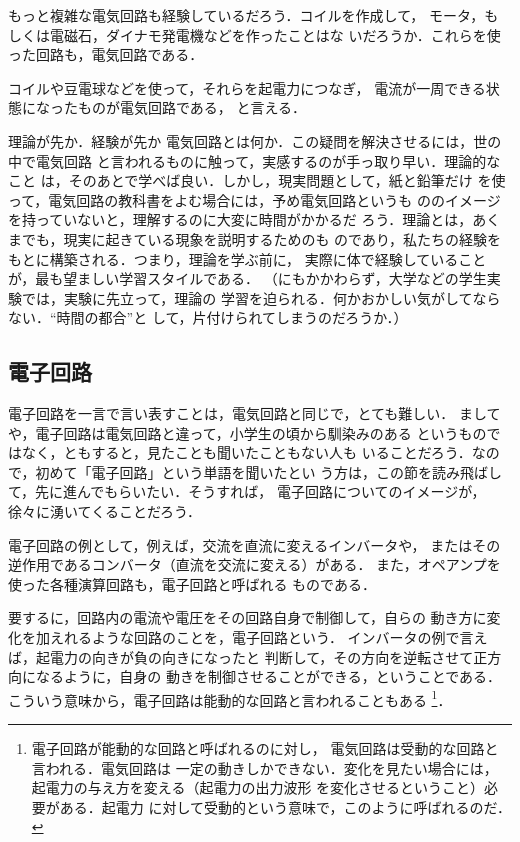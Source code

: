         もっと複雑な電気回路も経験しているだろう．コイルを作成して，
        モータ，もしくは電磁石，ダイナモ発電機などを作ったことはな
        いだろうか．これらを使った回路も，電気回路である．

        コイルや豆電球などを使って，それらを起電力につなぎ，
        電流が一周できる状態になったものが電気回路である，
        と言える．

        \begin{memo}{理論が先か．経験が先か}
            電気回路とは何か．この疑問を解決させるには，世の中で電気回路
            と言われるものに触って，実感するのが手っ取り早い．理論的なこと
            は，そのあとで学べば良い．しかし，現実問題として，紙と鉛筆だけ
            を使って，電気回路の教科書をよむ場合には，予め電気回路というも
            ののイメージを持っていないと，理解するのに大変に時間がかかるだ
            ろう．理論とは，あくまでも，現実に起きている現象を説明するためのも
            のであり，私たちの経験をもとに構築される．つまり，理論を学ぶ前に，
            実際に体で経験していることが，最も望ましい学習スタイルである．
            （にもかかわらず，大学などの学生実験では，実験に先立って，理論の
            学習を迫られる．何かおかしい気がしてならない．“時間の都合”と
            して，片付けられてしまうのだろうか．）
        \end{memo}

    \subsection{電子回路}
        電子回路を一言で言い表すことは，電気回路と同じで，とても難しい．
        ましてや，電子回路は電気回路と違って，小学生の頃から馴染みのある
        というものではなく，ともすると，見たことも聞いたこともない人も
        いることだろう．なので，初めて「電子回路」という単語を聞いたとい
        う方は，この節を読み飛ばして，先に進んでもらいたい．そうすれば，
        電子回路についてのイメージが，徐々に湧いてくることだろう．

        電子回路の例として，例えば，交流を直流に変えるインバータや，
        またはその逆作用であるコンバータ（直流を交流に変える）がある．
        また，オペアンプを使った各種演算回路も，電子回路と呼ばれる
        ものである．

        要するに，回路内の電流や電圧をその回路自身で制御して，自らの
        動き方に変化を加えれるような回路のことを，電子回路という．
        インバータの例で言えば，起電力の向きが負の向きになったと
        判断して，その方向を逆転させて正方向になるように，自身の
        動きを制御させることができる，ということである．
        こういう意味から，電子回路は能動的な回路と言われることもある
            \footnote{
                電子回路が能動的な回路と呼ばれるのに対し，
                電気回路は受動的な回路と言われる．電気回路は
                一定の動きしかできない．変化を見たい場合には，
                起電力の与え方を変える（起電力の出力波形
                を変化させるということ）必要がある．起電力
                に対して受動的という意味で，このように呼ばれるのだ．
            }．

